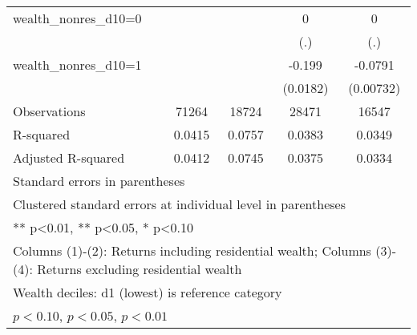 \begin{table}[htbp]
\begin{tabular}{l*{4}{c}}
wealth\_nonres\_d10=0&                  &                  &        0         &        0         \\
                &                  &                  &      (.)         &      (.)         \\
\addlinespace
wealth\_nonres\_d10=1&                  &                  &   -0.199\sym{***}&  -0.0791\sym{***}\\
                &                  &                  & (0.0182)         &(0.00732)         \\
\midrule
Observations    &    71264         &    18724         &    28471         &    16547         \\
R-squared       &   0.0415         &   0.0757         &   0.0383         &   0.0349         \\
Adjusted R-squared&   0.0412         &   0.0745         &   0.0375         &   0.0334         \\
\bottomrule
\multicolumn{5}{l}{\footnotesize Standard errors in parentheses}\\
\multicolumn{5}{l}{\footnotesize Clustered standard errors at individual level in parentheses}\\
\multicolumn{5}{l}{\footnotesize *** p<0.01, ** p<0.05, * p<0.10}\\
\multicolumn{5}{l}{\footnotesize Columns (1)-(2): Returns including residential wealth; Columns (3)-(4): Returns excluding residential wealth}\\
\multicolumn{5}{l}{\footnotesize Wealth deciles: d1 (lowest) is reference category}\\
\multicolumn{5}{l}{\footnotesize \sym{*} \(p<0.10\), \sym{**} \(p<0.05\), \sym{***} \(p<0.01\)}\\
\end{tabular}
\end{table}
